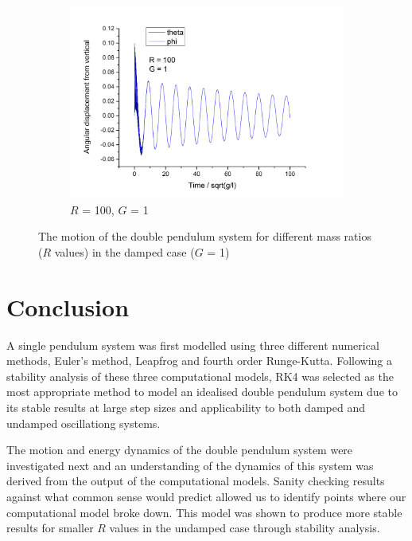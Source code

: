 \documentclass[11pt]{article}
\begin{document}
\begin{figure}[h!]
\begin{subfigure}[h]{0.5\textwidth}
    \includegraphics[width=\textwidth]{img/dp/R=100_G=1.png}
    \captionsetup{width=0.85\textwidth}
    \caption{$R$ = 100, $G$ = 1}
    \label{fig:dp_R1_G0}
  \end{subfigure}
  \caption{The motion of the double pendulum system for different mass ratios ($R$ values) in the damped case ($G$ = 1)}
\end{figure}

%
%
%
\section{Conclusion}
A single pendulum system was first modelled using three different numerical methods, Euler's method, Leapfrog and fourth order Runge-Kutta. Following a stability analysis of these three computational models, RK4 was selected as the most appropriate method to model an idealised double pendulum system due to its stable results at large step sizes and applicability to both damped and undamped oscillationg systems.

The motion and energy dynamics of the double pendulum system were investigated next and an understanding of the dynamics of this system was derived from the output of the computational models. Sanity checking results against what common sense would predict allowed us to identify points where our computational model broke down. This model was shown to produce more stable results for smaller $R$ values in the undamped case through stability analysis.
\end{document}
